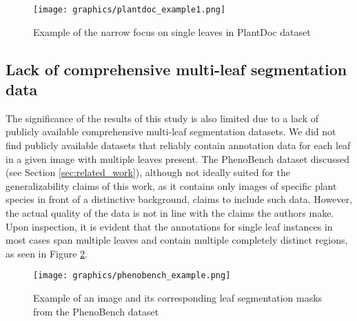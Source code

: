 \documentclass[draft,final]{vutinfth} %
\begin{document}
\iffalse
In an attempt to create correct leaf classifications, segmentation regions (described in Section \ref{sec:results_total}) were selected from the results, which are specific to the dataset at hand and cannot be generalized to any situation, reflecting the conditions described above and shown in Figure \ref{fig:plant_doc_example}. However, even with this specific condition, the performance of the best pipeline configuration still classifies about 30\% of the images presented with the wrong label. Although these performances do not accurately reflect the pipelines' performance in real-world scenarios, they present a baseline for comparison of the different presented methods and give a basic understanding of the performance characteristics of each configuration.
\fi

\begin{figure}
    \centering
    \texttt{[image: graphics/plantdoc\_example1.png]}
    \caption{Example of the narrow focus on single leaves in PlantDoc dataset \cite{singh_plantdoc_2020}}
    \label{fig:plant_doc_example}
\end{figure}

\subsection{Lack of comprehensive multi-leaf segmentation data}
The significance of the results of this study is also limited due to a lack of publicly available comprehensive multi-leaf segmentation datasets. We did not find publicly available datasets that reliably contain annotation data for each leaf in a given image with multiple leaves present. The PhenoBench dataset discussed \cite{weyler_phenobench_2023} (see Section \ref{sec:related_work}), although not ideally suited for the generalizability claims of this work, as it contains only images of specific plant species in front of a distinctive background, claims to include such data. However, the actual quality of the data is not in line with the claims the authors make. Upon inspection, it is evident that the annotations for single leaf instances in most cases span multiple leaves and contain multiple completely distinct regions, as seen in Figure \ref{fig:phenobench_example}. 

\begin{figure}
    \centering
    \texttt{[image: graphics/phenobench\_example.png]}
    \caption{Example of an image and its corresponding leaf segmentation masks from the PhenoBench dataset \cite{weyler_phenobench_2023}}
    \label{fig:phenobench_example}
\end{figure}
\end{document}

